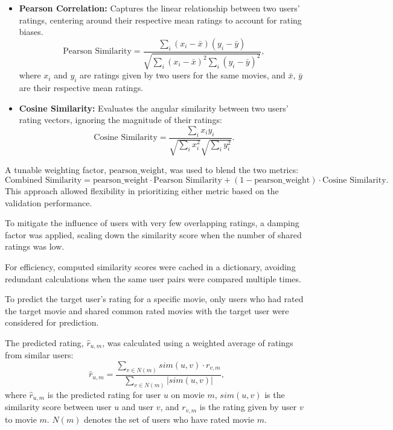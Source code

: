 \documentclass[a4paper,9pt]{article}
\begin{document}
\begin{itemize}
	\item \textbf{Pearson Correlation:} Captures the linear relationship between two users' ratings, centering around their respective mean ratings to account for rating biases.
	      \begin{equation}
		      \text{Pearson Similarity} = \frac{\sum_{i} (x_i - \bar{x})(y_i - \bar{y})}{\sqrt{\sum_{i} (x_i - \bar{x})^2 \sum_{i} (y_i - \bar{y})^2}},
	      \end{equation}
	      where \( x_i \) and \( y_i \) are ratings given by two users for the same movies, and \( \bar{x} \), \( \bar{y} \) are their respective mean ratings.

	\item \textbf{Cosine Similarity:} Evaluates the angular similarity between two users' rating vectors, ignoring the magnitude of their ratings:
	      \begin{equation}
		      \text{Cosine Similarity} = \frac{\sum_{i} x_i y_i}{\sqrt{\sum_{i} x_i^2} \sqrt{\sum_{i} y_i^2}}.
	      \end{equation}
\end{itemize}


A tunable weighting factor, \( \text{pearson\_weight} \), was used to blend the two metrics:
\begin{equation}
	\text{Combined Similarity} = \text{pearson\_weight} \cdot \text{Pearson Similarity} + (1 - \text{pearson\_weight}) \cdot \text{Cosine Similarity}.
\end{equation}
This approach allowed flexibility in prioritizing either metric based on the validation performance.

To mitigate the influence of users with very few overlapping ratings, a damping factor was applied, scaling down the
similarity score when the number of shared ratings was low.

For efficiency, computed similarity scores were cached in a dictionary, avoiding redundant calculations when the same user
pairs were compared multiple times.

To predict the target user's rating for a specific movie, only users who had rated the target movie and shared common
rated movies with the target user were considered for prediction.

The predicted rating, \( \hat{r}_{u,m} \), was calculated using a weighted average of ratings from similar users:
\begin{equation}
	\hat{r}_{u,m} = \frac{\sum_{v \in N(m)} sim(u,v) \cdot r_{v,m}}{\sum_{v \in N(m)} |sim(u,v)|},
\end{equation}
where \( \hat{r}_{u,m} \) is the predicted rating for user \( u \) on movie \( m \), \( sim(u,v) \) is the similarity score between user \( u \) and user \( v \), and \( r_{v,m} \) is the rating given by user \( v \) to movie \( m \). \( N(m) \) denotes the set of users who have rated movie \( m \).
\end{document}

